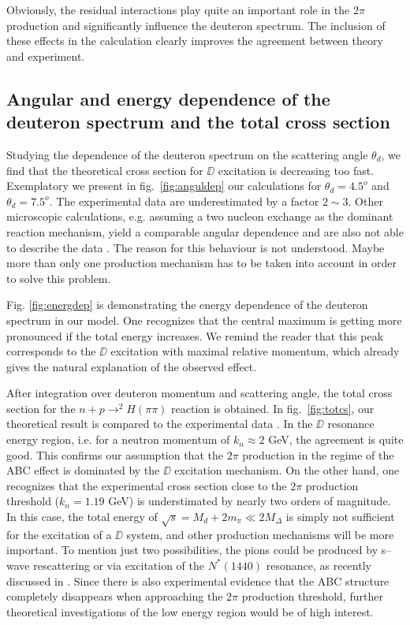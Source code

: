 Obviously, the residual interactions play quite an important role in 
the $2\pi$ production and significantly influence the deuteron spectrum.
The inclusion of these effects in the calculation clearly improves the agreement 
between theory and experiment.


\subsection{Angular and energy dependence of the deuteron spectrum 
  and the total cross section}

Studying the dependence of the deuteron spectrum on the scattering angle
$\theta_d$, we find that the theoretical cross section for $\DD$ excitation
is decreasing too fast. Exemplatory we present in fig.\ \ref{fig:anguldep}
our calculations for $\theta_d = 4.5^o$ and $\theta_d = 7.5^o$. The experimental 
data \cite{plouin78} are underestimated by a factor $2 \sim 3$. 
Other microscopic calculations, e.g. assuming a two nucleon exchange as the
dominant reaction mechanism, yield a comparable angular dependence and are
also not able to describe the data \cite{Anjos73,Anjos76}. The reason for this behaviour is not
understood. Maybe more than only one production mechanism has to be taken into
account in order to solve this problem.

Fig. \ref{fig:energdep} is demonstrating the energy dependence
of the deuteron spectrum in our model. One recognizes that the central maximum 
is getting more pronounced if the total energy increases. 
We remind the reader that this peak corresponds to the $\DD$ excitation 
with maximal relative momentum, which already gives the natural explanation 
of the observed effect. 

After integration over deuteron momentum and scattering angle, the total cross 
section for the $n+p \rightarrow ^2H (\pi\pi)$ reaction is obtained.
In fig.\ \ref{fig:totcs}, our theoretical result is compared to the 
experimental data \cite{plouin78,abdivaliev80,barnir73,hollas82}.
In the $\DD$ resonance energy region, i.e. for a neutron momentum 
of $k_n \approx 2$ GeV, the agreement is quite good. This confirms our 
assumption that the $2\pi$ production in the regime of the ABC effect
is dominated by the $\DD$ excitation mechanism. On the other hand, 
one recognizes that the experimental cross section close to 
the $2\pi$ production threshold ($k_n = 1.19$ GeV) is understimated by 
nearly two orders of magnitude. In this case,
the total energy of $\sqrt{s} = M_d + 2 m_\pi \ll 2M_\Delta$    
is simply not sufficient for the excitation of a $\DD$ system,
and other production mechanisms will be more important.
To mention just two possibilities, the pions could be produced 
by s--wave rescattering or via excitation of the $N^* (1440)$ resonance,
as recently discussed in \cite{alvarez98}. Since there is also
experimental evidence \cite{hollas82} that the ABC structure completely 
disappears when approaching the $2 \pi$ production threshold, further
theoretical investigations of the low energy region would be of
high interest.





